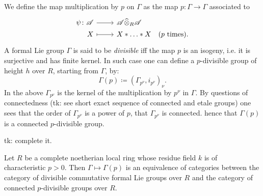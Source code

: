 \documentclass[../Main]{subfiles}
\begin{document}
\begin{ex}[]
	We define the map multiplication by $p$ on $\Gamma$ as the map $p\colon \Gamma \to \Gamma$
	associated to 
	\begin{equation}
	\begin{tikzcd}[row sep = 0ex
		,/tikz/column 1/.append style={anchor=base east}
		,/tikz/column 2/.append style={anchor=base west}]
		\psi\colon \mathscr{A} \arrow[r, "", rightarrow] &
		\mathscr{A} \widehat{\otimes}_R \mathscr{A} \\
		X \arrow[r, "", mapsto] & 
		X \ast \ldots \ast X
	\quad \text{($p$ times)}
	.\end{tikzcd}
	\end{equation} 
	A formal Lie group $\Gamma$ is said to be {\em divisible} iff the map $p$ is 
	an isogeny, i.e. it is surjective and has finite kernel.
	In such case one can define a $p$-divisible group of height $h$
	over $R$, starting from $\Gamma$, by:
	\begin{equation}
		\Gamma(p) \coloneqq \left(\Gamma_{p^\nu}, i_{p^\nu}\right)_\nu
	.\end{equation} 
	In the above $\Gamma_{p^\nu}$ is the kernel of the multiplication by $p^\nu$ 
	in $\Gamma$.
	By questions of connectedness (tk: see short exact sequence of connected
	and etale groups) one sees that the order of $\Gamma_{p^\nu}$
	is a power of $p$, that $\Gamma_{p^\nu}$ is connected.
	hence that $\Gamma(p)$ is a connected $p$-divisible group.

	tk: complete it.
\end{ex}

\begin{prop}[]
	Let $R$ be a complete noetherian local ring whose residue field $k$
	is of characteristic $p > 0$.
	Then $\Gamma \mapsto \Gamma(p)$ is an equivalence of categories
	between the category of divisible commutative formal Lie groups over $R$
	and the category of connected $p$-divisible groups over $R$.
\end{prop}
\end{document}
